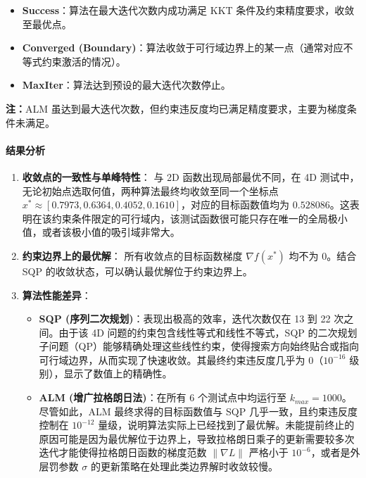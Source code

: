 \documentclass[a4paper,12pt]{article}
\begin{document}
\begin{table}[H]
{\begin{flushleft}
\begin{itemize}
        \setlength\itemsep{0pt}  %
        \setlength\parsep{0pt}   %
        \setlength{\leftmargin}{1.5em} %
        \item \textbf{Success}：算法在最大迭代次数内成功满足 KKT 条件及约束精度要求，收敛至最优点。
        \item \textbf{Converged (Boundary)}：算法收敛于可行域边界上的某一点（通常对应不等式约束激活的情况）。
        \item \textbf{MaxIter}：算法达到预设的最大迭代次数停止。
    \end{itemize}
    \textbf{注：}ALM 虽达到最大迭代次数，但约束违反度均已满足精度要求，主要为梯度条件未满足。
\end{flushleft}
}
\end{table}



\paragraph{结果分析}

\begin{enumerate}
    \item \textbf{收敛点的一致性与单峰特性}：
    与 2D 函数出现局部最优不同，在 4D 测试中，无论初始点选取何值，两种算法最终均收敛至同一个坐标点 $x^* \approx [0.7973, 0.6364, 0.4052, 0.1610]$，对应的目标函数值均为 $0.528086$。这表明在该约束条件限定的可行域内，该测试函数很可能只存在唯一的全局极小值，或者该极小值的吸引域非常大。

    \item \textbf{约束边界上的最优解}：
    所有收敛点的目标函数梯度 $\nabla f(x^*)$ 均不为 0。结合 SQP 的收敛状态，可以确认最优解位于约束边界上。

    \item \textbf{算法性能差异}：
    \begin{itemize}
        \item \textbf{SQP (序列二次规划)}：表现出极高的效率，迭代次数仅在 13 到 22 次之间。由于该 4D 问题的约束包含线性等式和线性不等式，SQP 的二次规划子问题（QP）能够精确处理这些线性约束，使得搜索方向始终贴合或指向可行域边界，从而实现了快速收敛。其最终约束违反度几乎为 0（$10^{-16}$ 级别），显示了数值上的精确性。
        \item \textbf{ALM (增广拉格朗日法)}：在所有 6 个测试点中均运行至 $k_{max}=1000$。尽管如此，ALM 最终求得的目标函数值与 SQP 几乎一致，且约束违反度控制在 $10^{-12}$ 量级，说明算法实际上已经找到了最优解。未能提前终止的原因可能是因为最优解位于边界上，导致拉格朗日乘子的更新需要较多次迭代才能使得拉格朗日函数的梯度范数 $\|\nabla L\|$ 严格小于 $10^{-6}$，或者是外层罚参数 $\sigma$ 的更新策略在处理此类边界解时收敛较慢。
    \end{itemize}
\end{enumerate}
\end{document}
